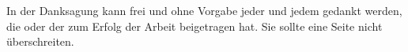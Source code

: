 
\begin{Danksagung}
    In der Danksagung kann frei und ohne Vorgabe jeder und jedem gedankt werden, die oder der zum Erfolg der Arbeit beigetragen hat. Sie sollte eine Seite nicht überschreiten.
\end{Danksagung}
\newpage

